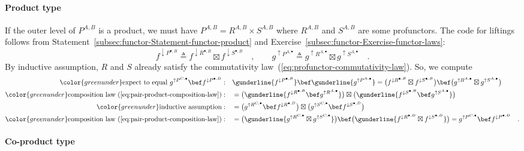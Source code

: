 \paragraph{Product type}

If the outer level of $P^{A,B}$ is a product, we must have $P^{A,B}=R^{A,B}\times S^{A,B}$
where $R^{A,B}$ and $S^{A,B}$ are some profunctors. The code for
liftings follows from Statement~\ref{subsec:functor-Statement-functor-product}
and Exercise~\ref{subsec:functor-Exercise-functor-laws}:
\[
f^{\downarrow P^{\bullet,B}}\triangleq f^{\downarrow R^{\bullet,B}}\boxtimes f^{\downarrow S^{\bullet,B}}\quad,\quad\quad g^{\uparrow P^{A,\bullet}}\triangleq g^{\uparrow R^{A,\bullet}}\boxtimes g^{\uparrow S^{A,\bullet}}\quad.
\]
By inductive assumption, $R$ and $S$ already satisfy the commutativity
law~(\ref{eq:profunctor-commutativity-law}). So, we compute
\begin{align*}
{\color{greenunder}\text{expect to equal }g^{\uparrow P^{C,\bullet}}\bef f^{\downarrow P^{\bullet,D}}:}\quad & \gunderline{f^{\downarrow P^{\bullet,B}}}\bef\gunderline{g^{\uparrow P^{A,\bullet}}}=\big(f^{\downarrow R^{\bullet,B}}\boxtimes f^{\downarrow S^{\bullet,B}}\big)\bef\big(g^{\uparrow R^{A,\bullet}}\boxtimes g^{\uparrow S^{A,\bullet}}\big)\\
{\color{greenunder}\text{composition law~(\ref{eq:pair-product-composition-law})}:}\quad & =\big(\gunderline{f^{\downarrow R^{\bullet,B}}\bef g^{\uparrow R^{A,\bullet}}}\big)\boxtimes\big(\gunderline{f^{\downarrow S^{\bullet,B}}\bef g^{\uparrow S^{A,\bullet}}}\big)\\
{\color{greenunder}\text{inductive assumption}:}\quad & =\big(g^{\uparrow R^{C,\bullet}}\bef f^{\downarrow R^{\bullet,D}}\big)\boxtimes\big(g^{\uparrow S^{C,\bullet}}\bef f^{\downarrow S^{\bullet,D}}\big)\\
{\color{greenunder}\text{composition law~(\ref{eq:pair-product-composition-law})}:}\quad & =\big(\gunderline{g^{\uparrow R^{C,\bullet}}\boxtimes g^{\uparrow S^{C,\bullet}}}\big)\bef\big(\gunderline{f^{\downarrow R^{\bullet,D}}\boxtimes f^{\downarrow S^{\bullet,D}}}\big)=g^{\uparrow P^{C,\bullet}}\bef f^{\downarrow P^{\bullet,D}}\quad.
\end{align*}


\paragraph{Co-product type}

